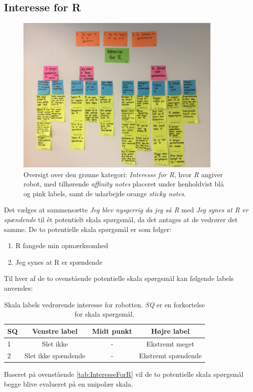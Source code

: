 \subsection{Interesse for R}
\label{ParametreInteresseForR}
%
\begin{figure}[H]
\centering
\includegraphics[width = 0.9\textwidth]{Figure/AffinityDiagram/InteresseForR} 
\caption{Oversigt over den grønne kategori: \textit{Interesse for R}, hvor \textit{R} angiver robot, med tilhørende \textit{affinity notes} placeret under henholdvist blå og pink labels, samt de udarbejde orange \textit{sticky notes}.}
\label{fig:AFInteresseForR}
\end{figure}
\noindent
%
Det vælges at sammensætte \textit{Jeg blev nysgerrig da jeg så R} med \textit{Jeg synes at R er spændende} til ét potentielt skala spørgsmål, da det antages at de vedrører det samme. De to potentielle skala spørgsmål er som følger: \blankline
%
\begin{enumerate}
  \item R fangede min opmærksomhed
  \item Jeg synes at R er spændende\blankline
\end{enumerate}
%
Til hver af de to ovenstående potentielle skala spørgsmål kan følgende labels anvendes:
%
\begin{table}[H]
	\centering 
	\begin{tabular}{l|c|c|c}
		SQ     & Venstre label & Midt punkt & Højre label \\\hline
		1   & Slet ikke & - & Ekstremt meget          \\\hline
		2   & Slet ikke spændende & - & Ekstremt spændende                 
	\end{tabular}
\caption{Skala labels vedrørende interesse for robotten. \textit{SQ} er en forkortelse for skala spørgsmål.}
	\label{tab:InteresseForR}
\end{table}
\noindent
%
Baseret på ovenstående \autoref{tab:InteresseForR} vil de to potentielle skala spørgsmål begge blive evalueret på en unipolær skala. 
%
